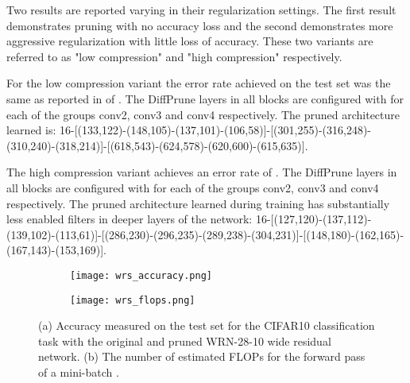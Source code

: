 \documentclass[final,1p,times]{elsarticle}
\begin{document}
Two results are reported varying in their regularization settings. The first result demonstrates pruning with no accuracy loss and the second demonstrates more aggressive regularization with little loss of accuracy. These two variants are referred to as "low compression" and "high compression" respectively.

For the low compression variant the error rate achieved on the test set was the same as reported in \cite{BMVC2016_87} of . The DiffPrune layers in all blocks are configured with  for each of the groups conv2, conv3 and conv4 respectively. The pruned architecture learned is: 16-[(133,122)-(148,105)-(137,101)-(106,58)]-[(301,255)-(316,248)-(310,240)-(318,214)]-[(618,543)-(624,578)-(620,600)-(615,635)].

The high compression variant achieves an error rate of . The DiffPrune layers in all blocks are configured with  for each of the groups conv2, conv3 and conv4 respectively. The pruned architecture learned during training has substantially less enabled filters in deeper layers of the network: 16-[(127,120)-(137,112)-(139,102)-(113,61)]-[(286,230)-(296,235)-(289,238)-(304,231)]-[(148,180)-(162,165)-(167,143)-(153,169)].

\begin{figure}[h!]
\centering
\begin{subfigure}{.5\textwidth}
    \centering
    \texttt{[image: wrs\_accuracy.png]}
    \caption{}
\end{subfigure}\begin{subfigure}{.5\textwidth}
    \centering
    \texttt{[image: wrs\_flops.png]}
    \caption{}
\end{subfigure}
\caption[short]{(a) Accuracy measured on the test set for the CIFAR10 classification task with the original and pruned WRN-28-10 wide residual network. (b) The number of estimated FLOPs for the forward pass of a mini-batch .}
\label{fig:wrn_plots}
\end{figure}
\end{document}
